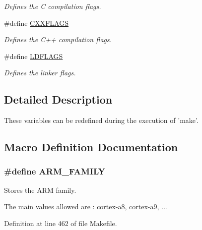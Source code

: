 \begin{DoxyCompactItemize}
\begin{DoxyCompactList}\small\item\em Defines the C compilation flags. \end{DoxyCompactList}\item 
\hypertarget{group___automatic___variables_gafdfbf6a8a87928f2448e0db6d441bd90}{\#define \hyperlink{group___automatic___variables_gafdfbf6a8a87928f2448e0db6d441bd90}{C\+X\+X\+F\+L\+A\+G\+S}}\label{group___automatic___variables_gafdfbf6a8a87928f2448e0db6d441bd90}

\begin{DoxyCompactList}\small\item\em Defines the C++ compilation flags. \end{DoxyCompactList}\item 
\hypertarget{group___automatic___variables_ga2dd4b41234e5a632ac37afce55156d7d}{\#define \hyperlink{group___automatic___variables_ga2dd4b41234e5a632ac37afce55156d7d}{L\+D\+F\+L\+A\+G\+S}}\label{group___automatic___variables_ga2dd4b41234e5a632ac37afce55156d7d}

\begin{DoxyCompactList}\small\item\em Defines the linker flags. \end{DoxyCompactList}\end{DoxyCompactItemize}


\subsection{Detailed Description}
These variables can be redefined during the execution of 'make'. 



\subsection{Macro Definition Documentation}
\hypertarget{group___automatic___variables_ga9682580d83fbc88967858af8593df6df}{
\subsubsection[{A\+R\+M\+\_\+\+F\+A\+M\+I\+L\+Y}]{\setlength{\rightskip}{0pt plus 5cm}\#define A\+R\+M\+\_\+\+F\+A\+M\+I\+L\+Y}}\label{group___automatic___variables_ga9682580d83fbc88967858af8593df6df}


Stores the A\+R\+M family. 

The main values allowed are \+: cortex-\/a8, cortex-\/a9, ... 

Definition at line 462 of file Makefile.

